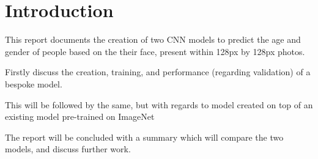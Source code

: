 





\section{Introduction}
This report documents the creation of two CNN models to predict the age and gender of people based on the their face, present within 128px by 128px photos.



Firstly discuss the creation, training, and performance (regarding validation) of a bespoke model.

This will be followed by the same, but with regards to model created on top of an existing model pre-trained on ImageNet

The report will be concluded with a summary which will compare the two models, and discuss further work.
